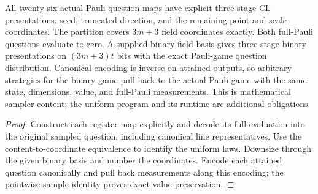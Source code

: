 \begin{lemma}
\label{lem:intro-pauli-cl-content}
\leanok
All twenty-six actual Pauli question maps have explicit three-stage CL
presentations: seed, truncated direction, and the remaining point and scale
coordinates. The partition covers $3m+3$ field coordinates exactly. Both
full-Pauli questions evaluate to zero. A supplied binary field basis gives
three-stage binary presentations on $(3m+3)t$ bits with the exact Pauli-game
question distribution. Canonical encoding is inverse on attained outputs,
so arbitrary strategies for the binary game pull back to the actual Pauli
game with the same state, dimensions, value, and full-Pauli measurements.
This is mathematical sampler content; the uniform program and its runtime
are additional obligations.
\end{lemma}
\begin{proof}
\leanok
Construct each register map explicitly and decode its full evaluation into
the original sampled question, including canonical line representatives.
Use the content-to-coordinate equivalence to identify the uniform laws.
Downsize through the given binary basis and number the coordinates. Encode
each attained question canonically and pull back measurements along this
encoding; the pointwise sample identity proves exact value preservation.
\end{proof}

